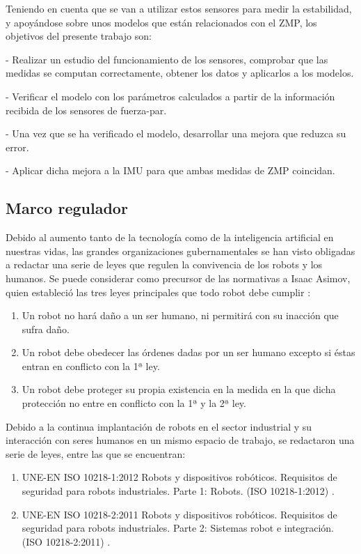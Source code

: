 Teniendo en cuenta que se van a utilizar estos sensores para medir la estabilidad, y apoyándose sobre unos modelos que están relacionados con el ZMP, los objetivos del presente trabajo son:

- Realizar un estudio del funcionamiento de los sensores, comprobar que las medidas se computan correctamente, obtener los datos y aplicarlos a los modelos.

- Verificar el modelo con los parámetros calculados a partir de la información recibida de los sensores de fuerza-par.

- Una vez que se ha verificado el modelo, desarrollar una mejora que reduzca su error.

- Aplicar dicha mejora a la IMU para que ambas medidas de ZMP coincidan.

\subsection{Marco regulador}

Debido al aumento tanto de la tecnología como de la inteligencia artificial en nuestras vidas, las grandes organizaciones gubernamentales se han visto obligadas a redactar una serie de leyes que regulen la convivencia de los robots y los humanos. Se puede considerar como precursor de las normativas a Isaac Asimov, quien estableció las tres leyes principales que todo robot debe cumplir \cite{ref1}:

\begin{enumerate}
\item Un robot no hará daño a un ser humano, ni permitirá con su inacción que sufra daño.
\item Un robot debe obedecer las órdenes dadas por un ser humano excepto si éstas entran en conflicto con la 1ª ley.
\item Un robot debe proteger su propia existencia en la medida en la que dicha protección no entre en conflicto con la 1ª y la 2ª ley.
\end{enumerate}

Debido a la continua implantación de robots en el sector industrial y su interacción con seres humanos en un mismo espacio de trabajo, se redactaron una serie de leyes, entre las que se encuentran:

\begin{enumerate}

\item UNE-EN ISO 10218-1:2012 Robots y dispositivos robóticos. Requisitos de seguridad para robots industriales. Parte 1: Robots. (ISO 10218-1:2012) \cite{ref27}.

\item UNE-EN ISO 10218-2:2011 Robots y dispositivos robóticos. Requisitos de seguridad para robots industriales. Parte 2: Sistemas robot e integración. (ISO 10218-2:2011) \cite{ref28}.

\end{enumerate}

